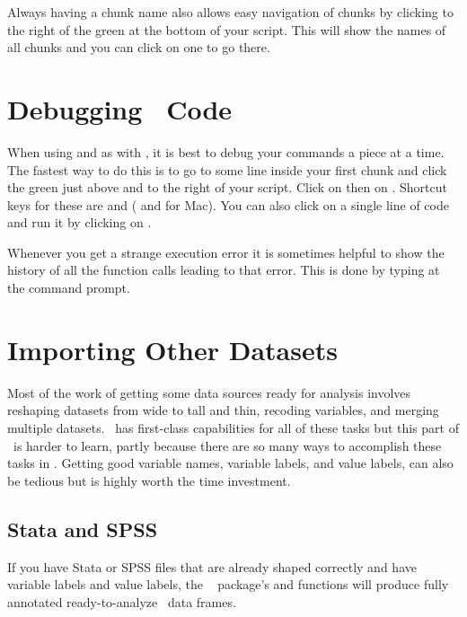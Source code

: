 Always having a chunk name also allows easy navigation of chunks by
clicking to the right of the green  at the bottom of your
script.  This will show the names of all chunks and you can click on
one to go there.

\section{Debugging \R\ Code}
When using  and  as with , it is
best to debug your commands a piece at a time.  The fastest way to do
this is to go to some line inside your first chunk and click the green
 just above and to the right of your script.  Click on  then on .  Shortcut keys for these
are  and  ( and  for Mac).  You can also click on a
single line of code and run it by clicking on .

Whenever you get a strange execution error it is sometimes helpful to
show the history of all the function calls leading to that error.
This is done by typing  at the command prompt.

\section{Importing Other Datasets}
Most of the work of getting some data sources ready for analysis involves
reshaping datasets from wide to tall and thin, recoding variables,
and merging multiple datasets.  \R\ has first-class capabilities for
all of these tasks but this part of \R\ is harder to learn, partly
because there are so many ways to accomplish these tasks in \R.
Getting good variable names, variable labels, and value labels, can
also be tedious but is highly worth the time investment.

\subsection{Stata and SPSS}
If you have Stata or SPSS files that are
already shaped correctly and have variable labels and value
labels, the \R\  package's  and
 functions will produce fully annotated
ready-to-analyze \R\ data frames.


